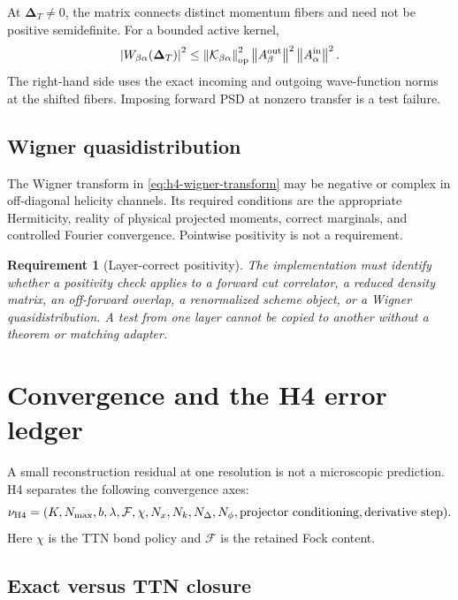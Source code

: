 \documentclass[11pt]{article}
\newtheorem{requirement}[definition]{Requirement}
\newcommand{\DT}{\bm{\Delta}_{T}}
\newcommand{\cK}{\mathcal K}
\newcommand{\cF}{\mathcal F}
\newcommand{\abs}[1]{\left|#1\right|}
\newcommand{\norm}[1]{\left\lVert#1\right\rVert}
\begin{document}
At \(\DT\ne0\), the matrix connects distinct momentum fibers and need not be
positive semidefinite.  For a bounded active kernel,
\begin{equation}
 \abs{W_{\beta\alpha}(\DT)}^2
 \leq
 \norm{\cK_{\beta\alpha}}_{\rm op}^2
 \norm{A_{\beta}^{\rm out}}^2
 \norm{A_{\alpha}^{\rm in}}^2.
 \label{eq:nonforward-cs-bound}
\end{equation}
The right-hand side uses the exact incoming and outgoing wave-function norms
at the shifted fibers.  Imposing forward PSD at nonzero transfer is a test
failure.

\subsection{Wigner quasidistribution}

The Wigner transform in \cref{eq:h4-wigner-transform} may be negative or
complex in off-diagonal helicity channels.  Its required conditions are the
appropriate Hermiticity, reality of physical projected moments, correct
marginals, and controlled Fourier convergence.  Pointwise positivity is not a
requirement.

\begin{requirement}[Layer-correct positivity]
\label{req:layer-correct-positivity}
The implementation must identify whether a positivity check applies to a
forward cut correlator, a reduced density matrix, an off-forward overlap, a
renormalized scheme object, or a Wigner quasidistribution.  A test from one
layer cannot be copied to another without a theorem or matching adapter.
\end{requirement}

\section{Convergence and the H4 error ledger}
\label{sec:convergence}

A small reconstruction residual at one resolution is not a microscopic
prediction.  H4 separates the following convergence axes:
\begin{equation}
 \nu_{\rm H4}=
 (K,N_{\max},b,\lambda,\cF,\chi,
 N_x,N_k,N_\Delta,N_\phi,\text{projector conditioning},\text{derivative step}).
 \label{eq:h4-convergence-axes}
\end{equation}
Here \(\chi\) is the TTN bond policy and \(\cF\) is the retained Fock content.

\subsection{Exact versus TTN closure}
\end{document}
